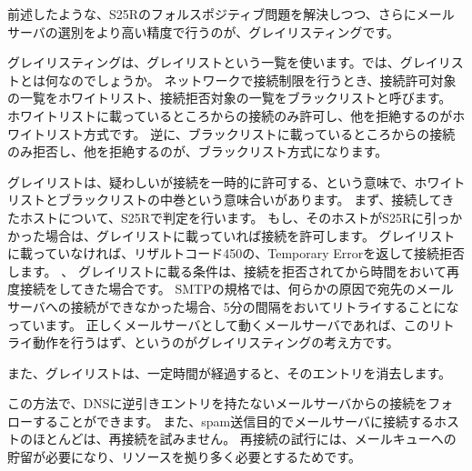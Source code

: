前述したような、S25Rのフォルスポジティブ問題を解決しつつ、さらにメールサーバの選別をより高い精度で行うのが、グレイリスティングです。

グレイリスティングは、グレイリストという一覧を使います。では、グレイリストとは何なのでしょうか。
ネットワークで接続制限を行うとき、接続許可対象の一覧をホワイトリスト、接続拒否対象の一覧をブラックリストと呼びます。
ホワイトリストに載っているところからの接続のみ許可し、他を拒絶するのがホワイトリスト方式です。
逆に、ブラックリストに載っているところからの接続のみ拒否し、他を拒絶するのが、ブラックリスト方式になります。

グレイリストは、疑わしいが接続を一時的に許可する、という意味で、ホワイトリストとブラックリストの中巻という意味合いがあります。
まず、接続してきたホストについて、S25Rで判定を行います。
もし、そのホストがS25Rに引っかかった場合は、グレイリストに載っていれば接続を許可します。
グレイリストに載っていなければ、リザルトコード450の、Temporary Errorを返して接続拒否します。
、
グレイリストに載る条件は、接続を拒否されてから時間をおいて再度接続をしてきた場合です。
SMTPの規格では、何らかの原因で宛先のメールサーバへの接続ができなかった場合、5分の間隔をおいてリトライすることになっています。
正しくメールサーバとして動くメールサーバであれば、このリトライ動作を行うはず、というのがグレイリスティングの考え方です。

また、グレイリストは、一定時間が経過すると、そのエントリを消去します。

この方法で、DNSに逆引きエントリを持たないメールサーバからの接続をフォローすることができます。
また、spam送信目的でメールサーバに接続するホストのほとんどは、再接続を試みません。
再接続の試行には、メールキューへの貯留が必要になり、リソースを拠り多く必要とするためです。


